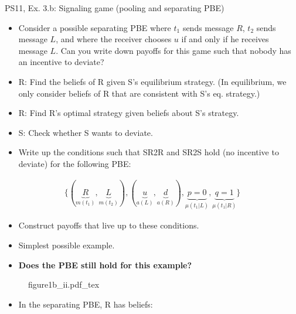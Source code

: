 \begin{frame}{PS11, Ex. 3.b: Signaling game (pooling and separating PBE)}
    \begin{itemize}
        \item[(b)] Consider a possible separating PBE where $t_1$ sends message $R$, $t_2$ sends message $L$, and where the receiver chooses $u$ if and only if he receives message $L$. Can you write down payoffs for this game such that nobody has an incentive to deviate?
    \end{itemize} \vspace{-8pt}
    \begin{multicols}{2}
      \begin{itemize}
        \item[SR3:] R: Find the beliefs of R given S's equilibrium strategy. (In equilibrium, we only consider beliefs of R that are consistent with S's eq. strategy.)
        \item[SR2R:] R: Find R's optimal strategy given beliefs about S's strategy.
        \item[SR2S:] S: Check whether S wants to deviate.
        \item[PBE:]  Write up the conditions such that SR2R and SR2S hold (no incentive to deviate) for the following PBE:
      \end{itemize}\vspace{-14pt}
      \begin{align*}
        \{(\underbrace{R}_{m(t_1)},\underbrace{L}_{m(t_2)}),(\underbrace{u}_{a(L)},\underbrace{d}_{a(R)}),\underbrace{p=0}_{\mu(t_1|L)},\underbrace{q=1}_{\mu(t_1|R)}\}
      \end{align*}\vspace{-12pt}
      \begin{itemize}
        \item[$\rightarrow$] Construct payoffs that live up to these conditions.
        \item[i:] Simplest possible example.
        \item[ii:] \textbf{Does the PBE still hold for this example?}
      \end{itemize}
      \vfill\null\columnbreak
      \begin{figure}[!h]
        \center
        \def\svgwidth{1.1\columnwidth}
        {figure1b_ii.pdf_tex}
      \end{figure} \vspace{-8pt}
      \begin{itemize}
        \item[SR3:] In the separating PBE, R has beliefs:\vspace{-10pt}

\end{itemize}
\end{multicols}
\end{frame}

